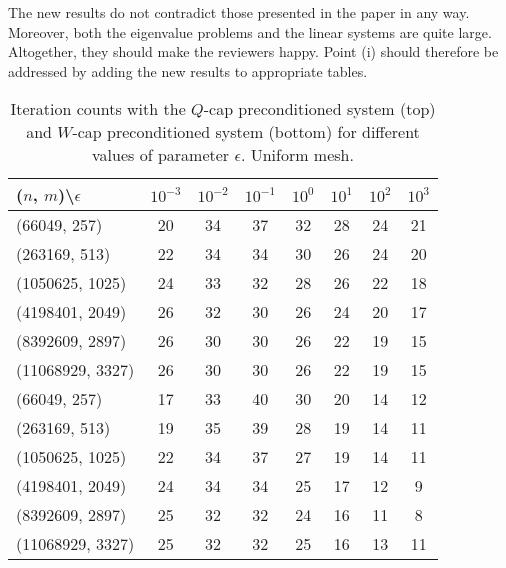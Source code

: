 \documentclass[10pt, a4paper]{article}
\begin{document}
The new results do not contradict those presented in the paper in any way. Moreover, 
both the eigenvalue problems and the linear systems are quite large. Altogether, 
they should make the reviewers happy. Point (i) should therefore be addressed by 
adding the new results to appropriate tables.
\begin{table}[ht]
  \caption{Iteration counts with the $Q$-cap preconditioned system (top) and $W$-cap 
  preconditioned system (bottom) for different values of parameter $\epsilon$. 
  Uniform mesh.
}
\label{tab:iter_unif}
\footnotesize{
\begin{tabular}{l|ccccccc}
\hline
($n$, $m$)\textbackslash $\epsilon$ & $10^{-3}$ & $10^{-2}$ & $10^{-1}$ & $10^{0}$ & $10^{1}$ & $10^{2}$ & $10^{3}$\\
\hline
(66049, 257) & 20 & 34 & 37 & 32 & 28 & 24 & 21\\
(263169, 513) & 22 & 34 & 34 & 30 & 26 & 24 & 20\\
(1050625, 1025) & 24 & 33 & 32 & 28 & 26 & 22 & 18\\
(4198401, 2049) & 26 & 32 & 30 & 26 & 24 & 20 & 17\\
(8392609, 2897) & 26 & 30 & 30 & 26 & 22 & 19 & 15\\
(11068929, 3327) & 26 & 30 & 30 & 26 & 22 & 19 & 15\\
\hline
\hline
(66049, 257) & 17 & 33 & 40 & 30 & 20 & 14 & 12\\
(263169, 513) & 19 & 35 & 39 & 28 & 19 & 14 & 11\\
(1050625, 1025) & 22 & 34 & 37 & 27 & 19 & 14 & 11\\
(4198401, 2049) & 24 & 34 & 34 & 25 & 17 & 12 & 9\\
(8392609, 2897) & 25 & 32 & 32 & 24 & 16 & 11 & 8\\
(11068929, 3327) & 25 & 32 & 32 & 25 & 16 & 13 & 11\\
\hline
\end{tabular}
}
\end{table}
%
\end{document}
